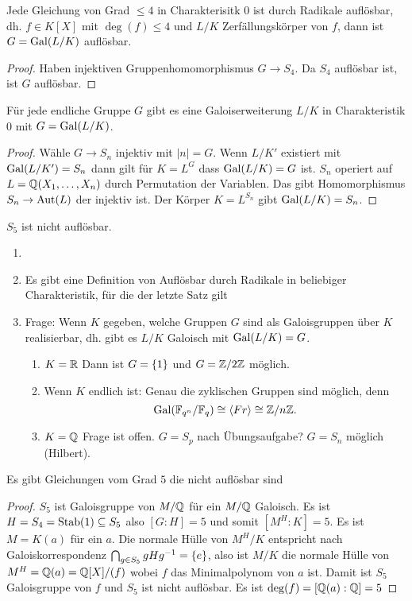 \begin{Kor}
    Jede Gleichung von Grad $\leq 4$ in Charakterisitk $0$ ist durch Radikale auflösbar, dh. $f\in K[X]$ mit $\deg(f)\leq 4$ und $L/K$ Zerfällungskörper von $f$, dann ist $G=\operatorname{Gal}(L/K)$ auflösbar.
\end{Kor}
\begin{proof}
    Haben injektiven Gruppenhomomorphismus $G\to S_4$. Da $S_4$ auflösbar ist, ist $G$ auflösbar.
\end{proof}
\begin{Satz}
    Für jede endliche Gruppe $G$ gibt es eine Galoiserweiterung $L/K$ in Charakteristik $0$ mit $G=\operatorname{Gal}(L/K)$.
\end{Satz}
\begin{proof}
    Wähle $G\to S_n$ injektiv mit $|n|=G$. Wenn $L/K'$ existiert mit $\operatorname{Gal}(L/K')=S_n$ dann gilt für $K=L^G$ dass $\operatorname{Gal}(L/K)=G$ ist.
    $S_n$ operiert auf $L=\mathbb{Q}(X_1,\dots,X_n)$ durch Permutation der Variablen. Das gibt Homomorphismus $S_n\to\operatorname{Aut}(L)$ der injektiv ist. Der Körper $K=L^{S_n}$ gibt $\operatorname{Gal}(L/K)=S_n$.
\end{proof}
\begin{Bem}
    $S_5$ ist nicht auflösbar. 
\end{Bem}
\begin{Bem}
    \begin{enumerate}
        \item[]
        \item Es gibt eine Definition von Auflösbar durch Radikale in beliebiger Charakteristik, für die der letzte Satz gilt
        \item Frage: Wenn $K$ gegeben, welche Gruppen $G$ sind als Galoisgruppen über $K$ realisierbar, dh. gibt es $L/K$ Galoisch mit $\operatorname{Gal}(L/K)=G$.
        \begin{enumerate}
            \item $K=\mathbb{R}$ Dann ist $G=\{1\}$ und $G=\mathbb{Z}/2\mathbb{Z}$ möglich.
            \item Wenn $K$ endlich ist: Genau die zyklischen Gruppen sind möglich, denn $$\operatorname{Gal}(\mathbb{F}_{q^n}/\mathbb{F}_q)\cong\langle Fr\rangle\cong\mathbb{Z}/n\mathbb{Z}.$$
            \item $K=\mathbb{Q}$ Frage ist offen. $G=S_p$ nach Übungsaufgabe?
            $G=S_n$ möglich (Hilbert).
        \end{enumerate}
    \end{enumerate}
\end{Bem}
\begin{Satz}
    Es gibt Gleichungen vom Grad $5$ die nicht auflösbar sind
    \end{Satz}
    \begin{proof}
        $S_5$ ist Galoisgruppe von $M/\mathbb{Q}$ für ein $M/\mathbb{Q}$ Galoisch. Es ist $H=S_4=\operatorname{Stab}(1)\subseteq S_5$ also $[G:H]=5$ und somit $[M^H:K]=5$. Es ist $M=K(a)$ für ein $a$. Die normale Hülle von $M^H/K$ entspricht nach Galoiskorrespondenz $\bigcap_{g\in S_5}gHg^{-1}=\{e\}$, also ist $M/K$ die normale Hülle von $M^H=\mathbb{Q}(a)=\mathbb{Q}[X]/(f)$ wobei $f$ das Minimalpolynom von $a$ ist. Damit ist $S_5$ Galoisgruppe von $f$ und $S_5$ ist nicht auflösbar. Es ist $\deg(f)=[\mathbb{Q}(a):\mathbb{Q}]=5$
    \end{proof}